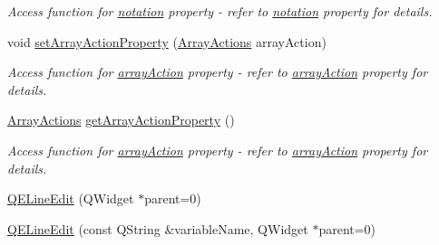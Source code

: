 \begin{DoxyCompactItemize}
\begin{DoxyCompactList}\small\item\em Access function for \hyperlink{classQELineEdit_a496e07607a7a0b46c8d176fb627526fb}{notation} property -\/ refer to \hyperlink{classQELineEdit_a496e07607a7a0b46c8d176fb627526fb}{notation} property for details. \end{DoxyCompactList}\item 
\hypertarget{classQELineEdit_a381e16060aaffa78eb621bf08d9bf895}{
void \hyperlink{classQELineEdit_a381e16060aaffa78eb621bf08d9bf895}{setArrayActionProperty} (\hyperlink{classQELineEdit_aed1607f3d06e29ed216cf5a7613415e1}{ArrayActions} arrayAction)}
\label{classQELineEdit_a381e16060aaffa78eb621bf08d9bf895}

\begin{DoxyCompactList}\small\item\em Access function for \hyperlink{classQELineEdit_aae37b6857fe07e38e9c1b56496673a59}{arrayAction} property -\/ refer to \hyperlink{classQELineEdit_aae37b6857fe07e38e9c1b56496673a59}{arrayAction} property for details. \end{DoxyCompactList}\item 
\hypertarget{classQELineEdit_a58b07cef4d251e3b71656008ec43d5c3}{
\hyperlink{classQELineEdit_aed1607f3d06e29ed216cf5a7613415e1}{ArrayActions} \hyperlink{classQELineEdit_a58b07cef4d251e3b71656008ec43d5c3}{getArrayActionProperty} ()}
\label{classQELineEdit_a58b07cef4d251e3b71656008ec43d5c3}

\begin{DoxyCompactList}\small\item\em Access function for \hyperlink{classQELineEdit_aae37b6857fe07e38e9c1b56496673a59}{arrayAction} property -\/ refer to \hyperlink{classQELineEdit_aae37b6857fe07e38e9c1b56496673a59}{arrayAction} property for details. \end{DoxyCompactList}\item 
\hyperlink{classQELineEdit_a7fa0165cedb74f1229d8443b5f365c6f}{QELineEdit} (QWidget $\ast$parent=0)
\item 
\hyperlink{classQELineEdit_a6dbb28860dea72242b8e044e002ff314}{QELineEdit} (const QString \&variableName, QWidget $\ast$parent=0)
\end{DoxyCompactItemize}
